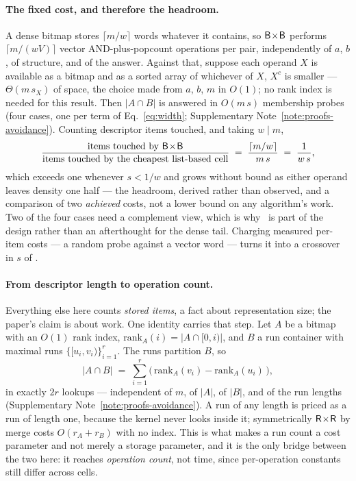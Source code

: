 \paragraph*{The fixed cost, and therefore the headroom.}
A dense bitmap stores $\lceil m/w\rceil$ words whatever it contains, so $\textsf{B}\!\times\!\textsf{B}$ performs
$\lceil m/(wV)\rceil$ vector AND-plus-popcount operations per pair, independently of $a$, $b$, of
structure, and of the answer. Against that, suppose each operand $X$ is available as a bitmap and as a
sorted array of whichever of $X$, $X^{c}$ is smaller --- $\Theta(m\,s_X)$ of space, the choice made
from $a$, $b$, $m$ in $O(1)$; no rank index is needed for this result. Then $|A\cap B|$ is answered in
$O(m\,s)$ membership probes (four cases, one per term of Eq.~\eqref{eq:width}; Supplementary Note~\ref{note:proofs-avoidance}).
Counting descriptor items touched, and taking $w \mid m$,
\begin{equation}
\frac{\text{items touched by } \textsf{B}\!\times\!\textsf{B}}{\text{items touched by the cheapest list-based cell}}
\;=\; \frac{\lceil m/w\rceil}{m\,s} \;=\; \frac{1}{w\,s},
\label{eq:headroom}
\end{equation}
which exceeds one whenever $s<1/w$ and grows without bound as either operand leaves density one half
--- the headroom, derived rather than observed, and a comparison of two \emph{achieved} costs, not a
lower bound on any algorithm's work. Two of the four cases need a complement view, which is why \rC\
is part of the design rather than an afterthought for the dense tail. Charging measured per-item
costs --- a random probe against a vector word --- turns it into a crossover in $s$ of
\nm{measured crossover in effective sparsity}.

\paragraph*{From descriptor length to operation count.}
Everything else here counts \emph{stored items}, a fact about representation size; the paper's claim
is about work. One identity carries that step. Let $A$ be a bitmap with an $O(1)$ rank index,
$\mathrm{rank}_A(i)=|A\cap[0,i)|$, and $B$ a run container with maximal runs
$\{[u_i,v_i)\}_{i=1}^{r}$. The runs partition $B$, so
\begin{equation}
|A \cap B| \;=\; \sum_{i=1}^{r}\big(\,\mathrm{rank}_A(v_i)-\mathrm{rank}_A(u_i)\,\big),
\label{eq:rank}
\end{equation}
in exactly $2r$ lookups --- independent of $m$, of $|A|$, of $|B|$, and of the run lengths
(Supplementary Note~\ref{note:proofs-avoidance}). A run of any length is priced as a run of length one, because the kernel never
looks inside it; symmetrically $\textsf{R}\!\times\!\textsf{R}$ by merge costs $O(r_A+r_B)$ with no index. This is
what makes a run count a cost parameter and not merely a storage parameter, and it is the only bridge
between the two here: it reaches \emph{operation count}, not time, since per-operation constants still
differ across cells.


